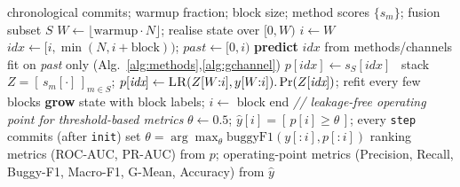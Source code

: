 \documentclass[11pt,a4paper]{article}
\newcommand{\code}[1]{\texttt{#1}}
\begin{document}
	\begin{algorithm}[H]
	\caption{Online prequential evaluation, operating point, and fusion}\label{alg:online-eval}
	\begin{algorithmic}[1]
	\Require chronological commits; warmup fraction; block size; method scores $\{s_m\}$; fusion subset $S$
	\State $W \gets \lfloor \text{warmup}\cdot N\rfloor$; realise state over $[0,W)$
	\State $i \gets W$
	  \State $\textit{idx}\gets[i,\min(N,i{+}\text{block}))$; \; $\textit{past}\gets[0,i)$
	  \State \textbf{predict} $\textit{idx}$ from methods/channels fit on \textit{past} only (Alg.~\ref{alg:methods},\ref{alg:gchannel})
	   $p[\textit{idx}]\gets s_{S}[\textit{idx}]$
	  \Else\ stack $Z=[\,s_m[\cdot]\,]_{m\in S}$; $p[\textit{idx}]\gets\textsc{LR}(Z[W{:}i],y[W{:}i]).\Pr(Z[\textit{idx}])$; refit every few blocks
	  \EndIf
	  \State \textbf{grow} state with block labels; \; $i \gets $ block end
	\EndWhile
	\Statex \textit{// leakage-free operating point for threshold-based metrics}
	\State $\theta\gets0.5$;  $\hat y[i]=[\,p[i]\ge\theta\,]$; every \code{step} commits (after \code{init}) set $\theta=\arg\max_\theta \text{buggyF1}(y[{:}i],p[{:}i])$ \EndFor
	\State \Return ranking metrics (ROC-AUC, PR-AUC) from $p$; operating-point metrics (Precision, Recall, Buggy-F1, Macro-F1, G-Mean, Accuracy) from $\hat y$
	\end{algorithmic}
	\end{algorithm}
\end{document}
